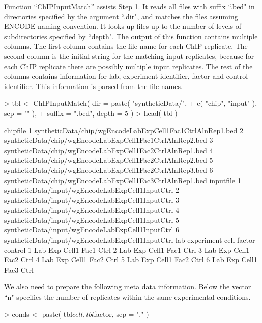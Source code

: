 \documentclass[a4paper,10pt]{article}
\begin{document}
Function ``ChIPInputMatch'' assists Step 1. It reads all files with suffix ``.bed" in directories specified by the argument ``.dir", and matches the files assuming ENCODE naming convention. It looks up files up to the number of levels of subdirectories specified by ``depth". The output of this function contains multiple columns. The first column contains the file name for each ChIP replicate. The second column is the initial string for the matching input replicates, because for each ChIP replicate there are possibly multiple input replicates. The rest of the columns contains information for lab, experiment identifier, factor and control identifier. This information is parsed from the file names.

\begin{Schunk}
\begin{Sinput}
> tbl <- ChIPInputMatch( dir = paste( "syntheticData/", 
+                          c( "chip", "input" ), sep = "" ), 
+                       suffix = ".bed", depth = 5 )
> head( tbl )
\end{Sinput}
\begin{Soutput}
                                                   chipfile
1 syntheticData/chip/wgEncodeLabExpCell1Fac1CtrlAlnRep1.bed
2 syntheticData/chip/wgEncodeLabExpCell1Fac1CtrlAlnRep2.bed
3 syntheticData/chip/wgEncodeLabExpCell1Fac2CtrlAlnRep1.bed
4 syntheticData/chip/wgEncodeLabExpCell1Fac2CtrlAlnRep2.bed
5 syntheticData/chip/wgEncodeLabExpCell1Fac2CtrlAlnRep3.bed
6 syntheticData/chip/wgEncodeLabExpCell1Fac3CtrlAlnRep1.bed
                                         inputfile
1 syntheticData/input/wgEncodeLabExpCell1InputCtrl
2 syntheticData/input/wgEncodeLabExpCell1InputCtrl
3 syntheticData/input/wgEncodeLabExpCell1InputCtrl
4 syntheticData/input/wgEncodeLabExpCell1InputCtrl
5 syntheticData/input/wgEncodeLabExpCell1InputCtrl
6 syntheticData/input/wgEncodeLabExpCell1InputCtrl
  lab experiment  cell factor control
1 Lab        Exp Cell1   Fac1    Ctrl
2 Lab        Exp Cell1   Fac1    Ctrl
3 Lab        Exp Cell1   Fac2    Ctrl
4 Lab        Exp Cell1   Fac2    Ctrl
5 Lab        Exp Cell1   Fac2    Ctrl
6 Lab        Exp Cell1   Fac3    Ctrl
\end{Soutput}
\end{Schunk}

We also need to prepare the following meta data information. Below the vector ``n" specifies the number of replicates within the same experimental conditions.

\begin{Schunk}
\begin{Sinput}
> conds <- paste( tbl$cell, tbl$factor, sep = "." )
\end{Sinput}
\end{Schunk}
\end{document}
